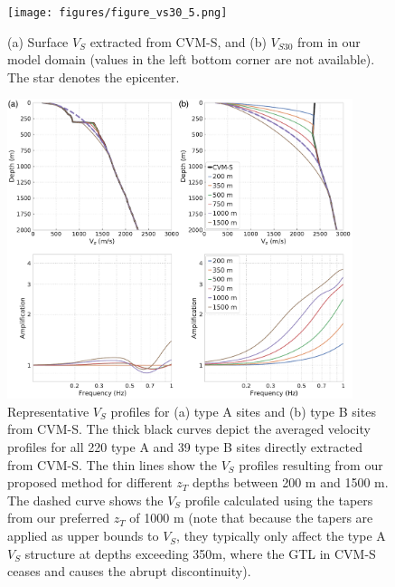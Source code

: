 \clearpage
\begin{figure}[!ht]
  \centering
  \texttt{[image: figures/figure\_vs30\_5.png]}
  \caption{(a) Surface $V_S$ extracted from CVM-S, and (b) $V_{S30}$ from \citet{thompsonUpdatedVs30Map2018} in our model domain (values in the left bottom corner are not available). The star denotes the epicenter.}
  \label{fig:vs30-5}
\end{figure}

\clearpage
\begin{figure}[!ht]
  \centering
  \includegraphics[width=0.9\textwidth]{figures/figure_vs30_6.pdf}
  \caption{Representative $V_S$ profiles for (a) type A sites and (b) type B sites from CVM-S. The thick black curves depict the averaged velocity profiles for all 220 type A and 39 type B sites directly extracted from CVM-S. The thin lines show the $V_S$ profiles resulting from our proposed method for different $z_T$ depths between 200 m and 1500 m. The dashed curve shows the $V_S$ profile calculated using the  tapers from our preferred $z_T$ of 1000 m (note that because the tapers are applied as upper bounds to $V_S$, they typically only affect the type A $V_S$ structure at depths exceeding 350m, where the GTL in CVM-S ceases and causes the abrupt discontinuity).}
  \label{fig:vs30-6}
\end{figure}

